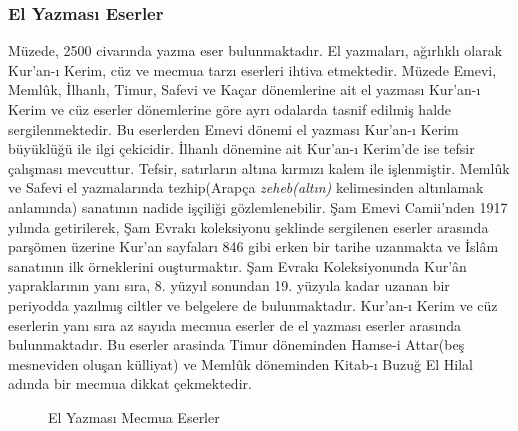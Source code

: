 \subsubsection{El Yazması Eserler}
\indent\indent Müzede, 2500 civarında yazma eser bulunmaktadır. El yazmaları, ağırlıklı olarak Kur'an-ı Kerim, cüz ve mecmua tarzı eserleri ihtiva etmektedir.\newline
\indent Müzede Emevi, Memlûk, İlhanlı, Timur, Safevi ve Kaçar dönemlerine ait el yazması Kur'an-ı Kerim ve cüz eserler dönemlerine göre ayrı odalarda tasnif edilmiş halde sergilenmektedir. Bu eserlerden Emevi dönemi el yazması Kur'an-ı Kerim büyüklüğü ile ilgi çekicidir. İlhanlı dönemine ait Kur'an-ı Kerim'de ise tefsir çalışması mevcuttur. Tefsir, satırların altına kırmızı kalem ile işlenmiştir. Memlûk ve Safevi el yazmalarında tezhip(Arapça \textit{zeheb(altın)} kelimesinden altınlamak anlamında) sanatının nadide işçiliği gözlemlenebilir. Şam Emevi Camii'nden 1917 yılında getirilerek, Şam Evrakı koleksiyonu şeklinde sergilenen eserler arasında parşömen üzerine Kur'an sayfaları 846 gibi erken bir tarihe uzanmakta ve İslâm sanatının ilk örneklerini ouşturmaktır. Şam Evrakı Koleksiyonunda Kur'ân yapraklarının yanı sıra, 8. yüzyıl sonundan 19. yüzyıla kadar uzanan bir periyodda yazılmış ciltler ve belgelere de bulunmaktadır.\newline
\indent Kur'an-ı Kerim ve cüz eserlerin yanı sıra az sayıda mecmua eserler de el yazması eserler arasında bulunmaktadır. Bu eserler arasinda Timur döneminden Hamse-i Attar(beş mesneviden oluşan külliyat) ve Memlûk döneminden Kitab-ı Buzuğ El Hilal adında bir mecmua dikkat çekmektedir.
\begin{figure}[H]
    \centering
    \hfill
    \caption{El Yazması Mecmua Eserler}
\end{figure}
